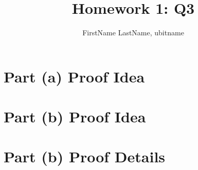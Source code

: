 \documentclass{cse331}
\title{Homework 1: Q3}
\author{FirstName LastName, ubitname}
\begin{document}
\maketitle

\section{Part (a) Proof Idea}


\section{Part (b) Proof Idea}


\section{Part (b) Proof Details}

\end{document}
